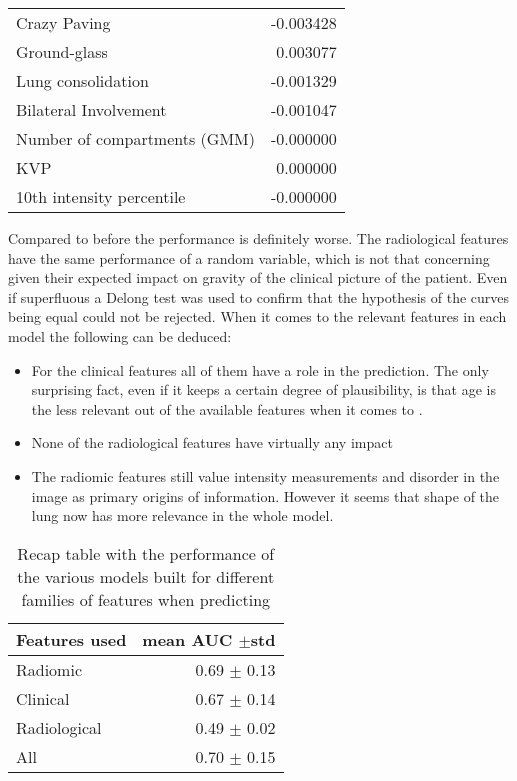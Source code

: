 \begin{table}
\begin{tabular}{lr}
		Crazy Paving                        &                     -0.003428 \\
		Ground-glass                        &                      0.003077 \\
		Lung consolidation                  &                     -0.001329 \\
		Bilateral Involvement               &                     -0.001047 \\
		Number of compartments (GMM)        &                     -0.000000 \\
		KVP                                 &                      0.000000 \\
		10th intensity percentile           &                     -0.000000 \\
		\bottomrule
		\end{tabular}
\end{table}

Compared to before the performance is definitely worse. 
The radiological features have the same performance of a random variable, which is not that concerning given their expected impact on gravity of the clinical picture of the patient.
Even if superfluous a Delong test was used to confirm that the hypothesis of the curves being equal could not be rejected. When it comes to the relevant features in each model the following can be deduced:

\begin{itemize}
\item For the clinical features all of them have a role in the prediction. The only surprising fact, even if it keeps a certain degree of plausibility, is that age is the less relevant out of the available features when it comes to \icu.
\item None of the radiological features have virtually any impact
\item The radiomic features still value intensity measurements and disorder in the image as primary origins of information. However it seems that shape of the lung now has more relevance in the whole model.
\end{itemize}

\begin{table}
\caption{Recap table with the performance of the various models built for different families of features when predicting \icu \label{tab:RecapICU}}
\centering
\begin{tabular}{l|r}
\toprule
Features used & mean AUC $\pm$std\\
\midrule
Radiomic  & 0.69 $\pm$ 0.13\\
Clinical  &  0.67 $\pm$ 0.14\\
Radiological & 0.49 $\pm$ 0.02\\
All & 0.70 $\pm$ 0.15 \\
\bottomrule
\end{tabular}
\end{table}

